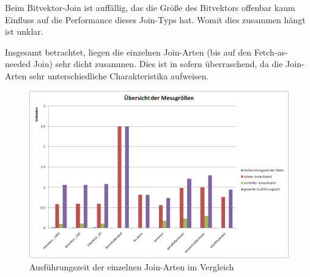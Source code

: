 \documentclass[fontsize=12pt,a4paper,headinclude=no,headings=small]{scrartcl}
\begin{document}
Beim Bitvektor-Join ist auffällig, das die Größe des Bitvektors offenbar kaum Einfluss auf die Performance dieses Join-Typs hat. Womit dies zusammen hängt ist unklar. 

Insgesamt betrachtet, liegen die einzelnen Join-Arten (bis auf den Fetch-as-needed Join) sehr dicht zusammen. Dies ist in sofern überraschend, da die Join-Arten sehr unterschiedliche Charakteristika aufweisen.

\begin{figure}[H]
	\centering
	\includegraphics[width=\textwidth]{results/join/diagrams/uebersicht.png}
	\caption{Ausführungszeit der einzelnen Join-Arten im Vergleich}
	\label{fig.join.compare.all}
\end{figure}
\end{document}
